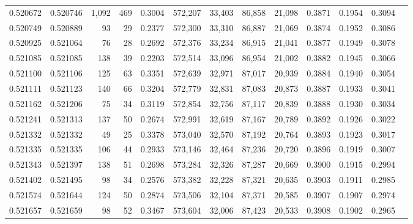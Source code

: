 \begin{tabular}{rrrrrrrrrrrrr}
0.520672 & 0.520746 & 1,092 &   469 &                                     0.3004 & 572,207 &  33,403 &  86,858 &  21,098 & 0.3871 & 0.1954 & 0.3094 \\
0.520749 & 0.520889 &    93 &    29 &                                     0.2377 & 572,300 &  33,310 &  86,887 &  21,069 & 0.3874 & 0.1952 & 0.3086 \\
0.520925 & 0.521064 &    76 &    28 &                                     0.2692 & 572,376 &  33,234 &  86,915 &  21,041 & 0.3877 & 0.1949 & 0.3078 \\
0.521085 & 0.521085 &   138 &    39 &                                     0.2203 & 572,514 &  33,096 &  86,954 &  21,002 & 0.3882 & 0.1945 & 0.3066 \\
0.521100 & 0.521106 &   125 &    63 &                                     0.3351 & 572,639 &  32,971 &  87,017 &  20,939 & 0.3884 & 0.1940 & 0.3054 \\
0.521111 & 0.521123 &   140 &    66 &                                     0.3204 & 572,779 &  32,831 &  87,083 &  20,873 & 0.3887 & 0.1933 & 0.3041 \\
0.521162 & 0.521206 &    75 &    34 &                                     0.3119 & 572,854 &  32,756 &  87,117 &  20,839 & 0.3888 & 0.1930 & 0.3034 \\
0.521241 & 0.521313 &   137 &    50 &                                     0.2674 & 572,991 &  32,619 &  87,167 &  20,789 & 0.3892 & 0.1926 & 0.3022 \\
0.521332 & 0.521332 &    49 &    25 &                                     0.3378 & 573,040 &  32,570 &  87,192 &  20,764 & 0.3893 & 0.1923 & 0.3017 \\
0.521335 & 0.521335 &   106 &    44 &                                     0.2933 & 573,146 &  32,464 &  87,236 &  20,720 & 0.3896 & 0.1919 & 0.3007 \\
0.521343 & 0.521397 &   138 &    51 &                                     0.2698 & 573,284 &  32,326 &  87,287 &  20,669 & 0.3900 & 0.1915 & 0.2994 \\
0.521402 & 0.521495 &    98 &    34 &                                     0.2576 & 573,382 &  32,228 &  87,321 &  20,635 & 0.3903 & 0.1911 & 0.2985 \\
0.521574 & 0.521644 &   124 &    50 &                                     0.2874 & 573,506 &  32,104 &  87,371 &  20,585 & 0.3907 & 0.1907 & 0.2974 \\
0.521657 & 0.521659 &    98 &    52 &                                     0.3467 & 573,604 &  32,006 &  87,423 &  20,533 & 0.3908 & 0.1902 & 0.2965 \\

\end{tabular}
